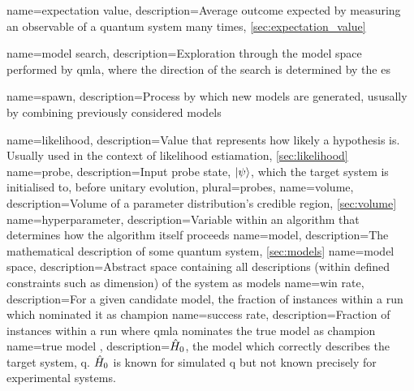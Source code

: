 



{
    name=expectation value,
    description={Average outcome expected by measuring an observable of a quantum system many times, \cref{sec:expectation_value}}
}

{
    name=model search,
    description={Exploration through the \gls{model space} performed by \gls{qmla}, where the direction of the search is determined by the \gls{es}}
}

{
    name=spawn,
    description={Process by which new models are generated, ususally by combining previously considered models}
}

{
    name=likelihood,
    description={Value that represents how likely a hypothesis is. Usually used in the context of likelihood estiamation, \cref{sec:likelihood}}
}
{
    name=probe,
    description={Input \gls{probe} state, $\ket{\psi}$, which the target system is initialised to, before unitary evolution},
    plural={probes},
}
{
    name=volume,
    description={Volume of a parameter distribution's credible region, \cref{sec:volume}}
}
{
    name=hyperparameter,
    description={Variable within an algorithm that determines how the algorithm itself proceeds}
}
{
    name=model,
    description={The mathematical description of some quantum system, \cref{sec:models}}
}
{
    name=model space,
    description={Abstract space containing all descriptions (within defined constraints such as dimension) of the system as models}
}
{
    name=win rate,
    description={For a given candidate model, the fraction of \glspl{instance} within a \gls{run} which nominated it as champion}
}
{
    name=success rate,
    description={Fraction of \glspl{instance} within a \gls{run} where \gls{qmla} nominates the \gls{true model} as \gls{champion}}
}
{
    name={true model} ,
    description={$\hat{H}_0$, the model which correctly describes the target system, \gls{q}. $\hat{H}_0$ is known for simulated \gls{q} 
    but not known precisely for experimental systems.}
}

